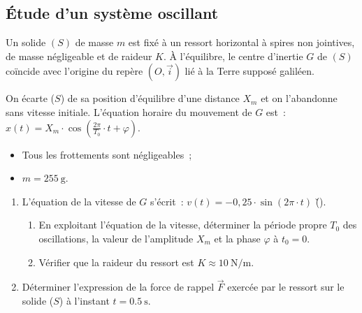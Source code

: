 \subsection{Étude d'un système oscillant}
\begin{minipage}[t][][t]{0.72\linewidth}
Un solide $(S)$ de masse $m$ est fixé à un ressort horizontal à spires non
jointives, de masse négligeable et de raideur $K$. À l'équilibre, le centre
d'inertie $G$ de $(S)$ coïncide avec l'origine du repère $(O,\vec{i})$ lié à la
Terre supposé galiléen.

On écarte ($S$) de sa position d'équilibre d'une distance $X_m$ et on
l'abandonne sans vitesse initiale. L'équation horaire du mouvement de $G$
est~: \\
$x(t)=X_m \cdot \cos\left(\frac{2\pi}{T_0} \cdot t+\varphi\right)$.
\end{minipage}
\hfill
\begin{minipage}[t][][t]{0.26\linewidth}
\begin{figure}[H]
    \flushright
    
    \caption{}
    \label{fig:solide_ressort}
\end{figure}
\end{minipage}

\begin{donnees}
    \begin{itemize}
        \item Tous les frottements sont négligeables~;
        \item $m=\qty{255}{\gram}$.
    \end{itemize}
\end{donnees}
\begin{enumerate}
    \item L'équation de la vitesse de $G$ s'écrit~:
          $v(t)=-0,25 \cdot \sin(2\pi\cdot t)$ \; (\unit{\v}).
          \begin{enumerate}
              \item En exploitant l'équation de la vitesse, déterminer la
                    période propre $T_0$ des oscillations, la valeur de
                    l'amplitude $X_m$ et la phase $\varphi$ à $t_0=0$.
              \item Vérifier que la raideur du ressort est
                    $K\approx\qty{10}{\newton\per\meter}$.
          \end{enumerate}
    \item Déterminer l'expression de la force de rappel $\vec{F}$ exercée par le
          ressort sur le solide ($S$) à l'instant $t=\qty{0,5}{\second}$.
\end{enumerate}
